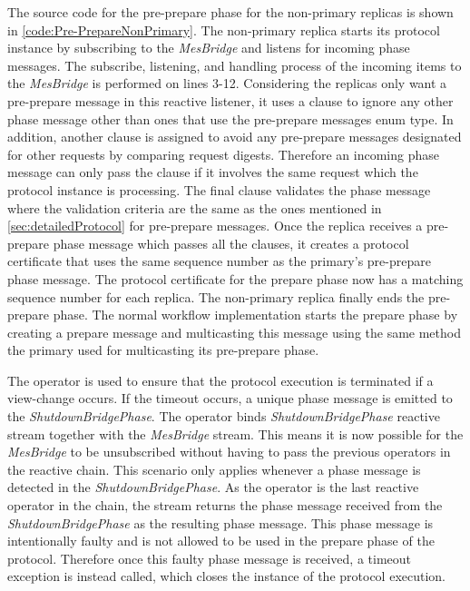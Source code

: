 The source code for the pre-prepare phase for the non-primary replicas is shown in \autoref{code:Pre-PrepareNonPrimary}. The non-primary replica starts its protocol instance by subscribing to the  \emph{MesBridge} and listens for incoming phase messages. The subscribe, listening, and handling process of the incoming items to the \emph{MesBridge} is performed on lines 3-12. Considering the replicas only want a pre-prepare message in this reactive listener, it uses a  clause to ignore any other phase message other than ones that use the pre-prepare messages enum type. In addition, another  clause is assigned to avoid any pre-prepare messages designated for other requests by comparing request digests. Therefore an incoming phase message can only pass the  clause if it involves the same request which the protocol instance is processing. The final  clause validates the phase message where the validation criteria are the same as the ones mentioned in \autoref{sec:detailedProtocol} for pre-prepare messages. Once the replica receives a pre-prepare phase message which passes all the  clauses, it creates a protocol certificate that uses the same sequence number as the primary’s pre-prepare phase message. The protocol certificate for the prepare phase now has a matching sequence number for each replica. The non-primary replica finally ends the pre-prepare phase. The normal workflow implementation starts the prepare phase by creating a prepare message and multicasting this message using the same method the primary used for multicasting its pre-prepare phase.

The  operator is used to ensure that the protocol execution is terminated if a view-change occurs. If the timeout occurs, a unique phase message is emitted to the  \emph{ShutdownBridgePhase}. The  operator binds \emph{ShutdownBridgePhase} reactive stream together with the \emph{MesBridge} stream. This means it is now possible for the \emph{MesBridge} to be unsubscribed without having to pass the previous operators in the reactive chain. This scenario only applies whenever a phase message is detected in the \emph{ShutdownBridgePhase}. As the  operator is the last reactive operator in the chain, the stream returns the phase message received from the \emph{ShutdownBridgePhase} as the resulting phase message. This phase message is intentionally faulty and is not allowed to be used in the prepare phase of the protocol. Therefore once this faulty phase message is received, a timeout exception is instead called, which closes the instance of the protocol execution.

